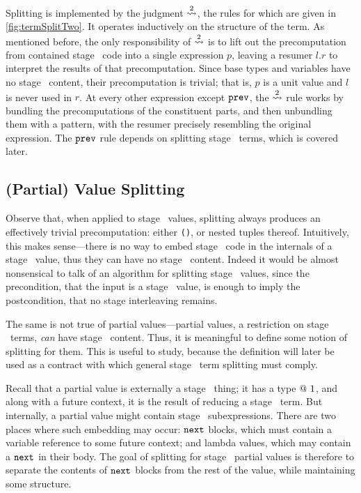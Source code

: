 Splitting is implemented by the judgment $\overset{ 2}\rightsquigarrow$,
the rules for which are given in \cref{fig:termSplitTwo}.  
It operates inductively on the structure of the term.  
As mentioned before, the only responsibility of $\overset{ 2}\rightsquigarrow$ is to lift out the precomputation
from contained stage \bbone\ code into a single expression $p$, 
leaving a resumer $l.r$ to interpret the results of that precomputation.
Since base types and variables have no stage \bbone\ content, their precomputation is trivial;
that is, $p$ is a unit value and $l$ is never used in $r$.
At every other expression except ${\tt prev}$, the $\overset{ 2}\rightsquigarrow$ rule works by bundling 
the precomputations of the constituent parts, and then unbundling them with a pattern,
with the resumer precisely resembling the original expression.
The ${\tt prev}$ rule depends on splitting stage \bbone\ terms, which is covered later.

\subsection{(Partial) Value Splitting}

Observe that, when applied to stage \bbtwo\ values, 
splitting always produces an effectively trivial precomputation:
either \texttt{()}, or nested tuples thereof.
Intuitively, this makes sense---there is no way to embed stage \bbone\ code
in the internals of a stage \bbtwo\ value, 
thus they can have no stage \bbone\ content.
Indeed it would be almost nonsensical to talk of an algorithm for splitting stage \bbtwo\ values,
since the precondition, that the input is a stage \bbtwo\ value, is enough to imply the postcondition,
that no stage interleaving remains.

The same is not true of partial values---partial values, a restriction on stage \bbone\ terms,
{\em can} have stage \bbtwo\ content.
Thus, it is meaningful to define some notion of splitting for them.
This is useful to study, because the definition will later be used as a contract 
with which general stage \bbone\ term splitting must comply.

Recall that a partial value is externally a stage \bbone\ thing; 
it has a type $@~ 1$, and along with a future context, it is the result of reducing a stage \bbone\ term.
But internally, a partial value might contain stage \bbtwo\ subexpressions.
There are two places where such embedding may occur: 
${\tt next}$ blocks, which must contain a variable reference to some future context; 
and lambda values, which may contain a ${\tt next}$ in their body.
The goal of splitting for stage \bbone\ partial values is therefore 
to separate the contents of ${\tt next}$ blocks from the rest of the value, 
while maintaining some structure.

